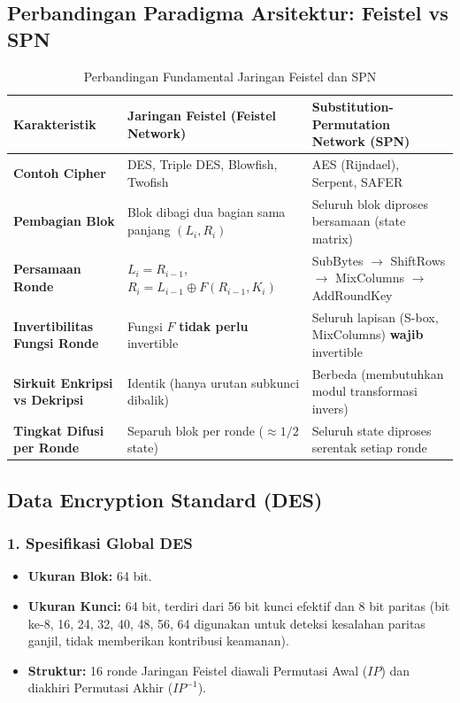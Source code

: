 \documentclass[11pt,a4paper]{article}
\begin{document}
\subsection{Perbandingan Paradigma Arsitektur: Feistel vs SPN}
\begin{table}[H]
\centering
\small
\begin{tabular}{p{4.2cm} p{5.5cm} p{5.5cm}}
\toprule
\textbf{Karakteristik} & \textbf{Jaringan Feistel (Feistel Network)} & \textbf{Substitution-Permutation Network (SPN)} \\
\midrule
\textbf{Contoh Cipher} & DES, Triple DES, Blowfish, Twofish & AES (Rijndael), Serpent, SAFER \\
\textbf{Pembagian Blok} & Blok dibagi dua bagian sama panjang $(L_i, R_i)$ & Seluruh blok diproses bersamaan (state matrix) \\
\textbf{Persamaan Ronde} & $L_i = R_{i-1}$, \quad $R_i = L_{i-1} \oplus F(R_{i-1}, K_i)$ & SubBytes $\to$ ShiftRows $\to$ MixColumns $\to$ AddRoundKey \\
\textbf{Invertibilitas Fungsi Ronde} & Fungsi $F$ \textbf{tidak perlu} invertible & Seluruh lapisan (S-box, MixColumns) \textbf{wajib} invertible \\
\textbf{Sirkuit Enkripsi vs Dekripsi} & Identik (hanya urutan subkunci dibalik) & Berbeda (membutuhkan modul transformasi invers) \\
\textbf{Tingkat Difusi per Ronde} & Separuh blok per ronde ($\approx 1/2$ state) & Seluruh state diproses serentak setiap ronde \\
\bottomrule
\end{tabular}
\caption{Perbandingan Fundamental Jaringan Feistel dan SPN}
\end{table}

\subsection{Data Encryption Standard (DES)}

\subsubsection{1. Spesifikasi Global DES}
\begin{itemize}[leftmargin=*]
    \item \textbf{Ukuran Blok:} 64 bit.
    \item \textbf{Ukuran Kunci:} 64 bit, terdiri dari 56 bit kunci efektif dan 8 bit paritas (bit ke-8, 16, 24, 32, 40, 48, 56, 64 digunakan untuk deteksi kesalahan paritas ganjil, tidak memberikan kontribusi keamanan).
    \item \textbf{Struktur:} 16 ronde Jaringan Feistel diawali Permutasi Awal ($IP$) dan diakhiri Permutasi Akhir ($IP^{-1}$).
\end{itemize}
\end{document}
